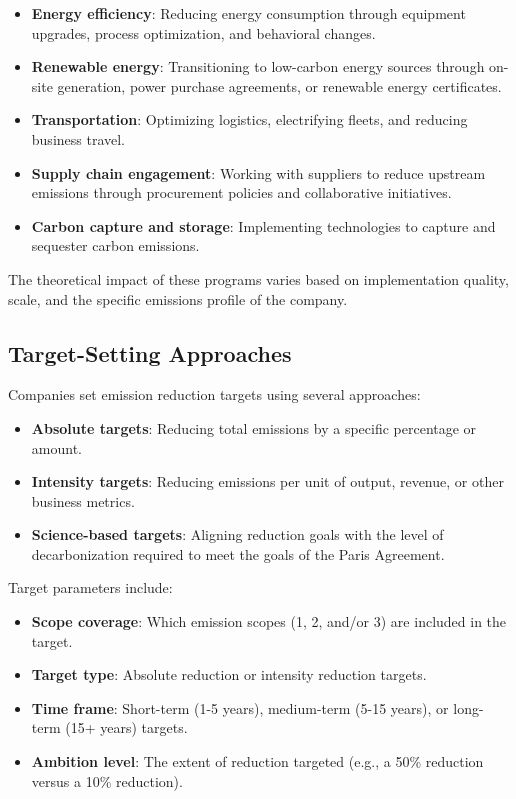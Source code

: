 \documentclass[11pt,a4paper]{article}
\begin{document}
\begin{itemize}
    \item \textbf{Energy efficiency}: Reducing energy consumption through equipment upgrades, process optimization, and behavioral changes.
    
    \item \textbf{Renewable energy}: Transitioning to low-carbon energy sources through on-site generation, power purchase agreements, or renewable energy certificates.
    
    \item \textbf{Transportation}: Optimizing logistics, electrifying fleets, and reducing business travel.
    
    \item \textbf{Supply chain engagement}: Working with suppliers to reduce upstream emissions through procurement policies and collaborative initiatives.
    
    \item \textbf{Carbon capture and storage}: Implementing technologies to capture and sequester carbon emissions.
\end{itemize}

The theoretical impact of these programs varies based on implementation quality, scale, and the specific emissions profile of the company.

\subsection{Target-Setting Approaches}
Companies set emission reduction targets using several approaches:

\begin{itemize}
    \item \textbf{Absolute targets}: Reducing total emissions by a specific percentage or amount.
    
    \item \textbf{Intensity targets}: Reducing emissions per unit of output, revenue, or other business metrics.
    
    \item \textbf{Science-based targets}: Aligning reduction goals with the level of decarbonization required to meet the goals of the Paris Agreement.
\end{itemize}

Target parameters include:
\begin{itemize}
    \item \textbf{Scope coverage}: Which emission scopes (1, 2, and/or 3) are included in the target.
    \item \textbf{Target type}: Absolute reduction or intensity reduction targets.
    \item \textbf{Time frame}: Short-term (1-5 years), medium-term (5-15 years), or long-term (15+ years) targets.
    \item \textbf{Ambition level}: The extent of reduction targeted (e.g., a 50\% reduction versus a 10\% reduction).
\end{itemize}
\end{document}
